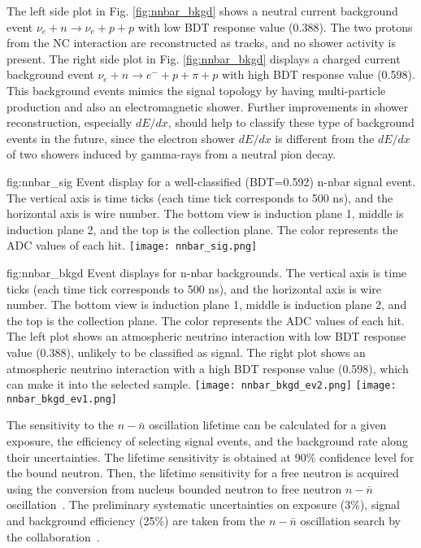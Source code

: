 The left side plot in Fig. \ref{fig:nnbar_bkgd} shows a neutral current background event $\nu_{e}+n\rightarrow \nu_{e}+p+p$ with low BDT response value (0.388). The two protons from the NC interaction are reconstructed as tracks, and no shower activity is present. The right side plot in Fig. \ref{fig:nnbar_bkgd} displays a charged current background event $\nu_{e}+n\rightarrow {e}^{-}+p+\pi +p$ with high BDT response value (0.598). This background events mimics the signal topology by having multi-particle production and also an electromagnetic shower. Further improvements in shower reconstruction, especially $dE/dx$, should help to classify these type of background events in the future, since the electron shower $dE/dx$ is different from the $dE/dx$ of two showers induced by gamma-rays from a neutral pion decay.

\begin{dunefigure}
{fig:nnbar_sig}
{Event display for a well-classified (BDT=0.592) n-nbar signal event.  The vertical axis is time ticks (each time tick corresponds to 500 ns), and the horizontal axis is wire number.  The bottom view is induction plane 1, middle is induction plane 2, and the top is the collection plane.  The color represents the ADC values of each hit.}
\texttt{[image: nnbar\_sig.png]}
\end{dunefigure} 

\begin{dunefigure}
{fig:nnbar_bkgd}
{Event displays for n-nbar backgrounds.  The vertical axis is time ticks (each time tick corresponds to 500 ns), and the horizontal axis is wire number.  The bottom view is induction plane 1, middle is induction plane 2, and the top is the collection plane.  The color represents the ADC values of each hit.  The left plot shows an atmospheric neutrino interaction with low BDT response value (0.388), unlikely to be classified as signal. The right plot shows an atmospheric neutrino interaction with a high BDT response value (0.598), which can make it into the selected sample.}
\texttt{[image: nnbar\_bkgd\_ev2.png]}
\texttt{[image: nnbar\_bkgd\_ev1.png]}
\end{dunefigure} 

The sensitivity to the $n-\bar{n}$ oscillation lifetime can be calculated for a given exposure, the efficiency of selecting signal events, and the background rate along their uncertainties. The lifetime sensitivity is obtained at 90\% confidence level for the bound neutron. Then, the lifetime sensitivity for a free neutron is acquired using the conversion from nucleus bounded neutron to free neutron $n-\bar{n}$ oscillation~\cite{Friedman:2008es}.  The preliminary systematic uncertainties on exposure (3\%), signal and background efficiency (25\%) are taken from the $n-\bar{n}$ oscillation search by the \superk collaboration~\cite{Abe:2011ky}.

